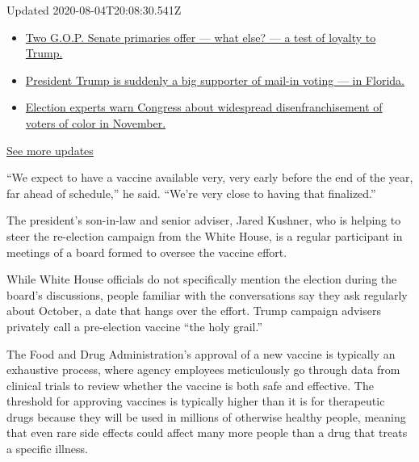 Updated 2020-08-04T20:08:30.541Z

\begin{itemize}
\tightlist
\item
  \href{https://www.nytimes3xbfgragh.onion/2020/08/04/us/elections/primary-election-michigan-arizona-kansas.html?action=click\&pgtype=Article\&state=default\&region=MAIN_CONTENT_1\&context=storylines_live_updates\#link-3924dd44}{Two
  G.O.P. Senate primaries offer --- what else? --- a test of loyalty to
  Trump.}
\item
  \href{https://www.nytimes3xbfgragh.onion/2020/08/04/us/elections/primary-election-michigan-arizona-kansas.html?action=click\&pgtype=Article\&state=default\&region=MAIN_CONTENT_1\&context=storylines_live_updates\#link-32b39e33}{President
  Trump is suddenly a big supporter of mail-in voting --- in Florida.}
\item
  \href{https://www.nytimes3xbfgragh.onion/2020/08/04/us/elections/primary-election-michigan-arizona-kansas.html?action=click\&pgtype=Article\&state=default\&region=MAIN_CONTENT_1\&context=storylines_live_updates\#link-6d019753}{Election
  experts warn Congress about widespread disenfranchisement of voters of
  color in November.}
\end{itemize}

\href{https://www.nytimes3xbfgragh.onion/2020/08/04/us/elections/primary-election-michigan-arizona-kansas.html?action=click\&pgtype=Article\&state=default\&region=MAIN_CONTENT_1\&context=storylines_live_updates}{See
more updates}

``We expect to have a vaccine available very, very early before the end
of the year, far ahead of schedule,'' he said. ``We're very close to
having that finalized.''

The president's son-in-law and senior adviser, Jared Kushner, who is
helping to steer the re-election campaign from the White House, is a
regular participant in meetings of a board formed to oversee the vaccine
effort.

While White House officials do not specifically mention the election
during the board's discussions, people familiar with the conversations
say they ask regularly about October, a date that hangs over the effort.
Trump campaign advisers privately call a pre-election vaccine ``the holy
grail.''

The Food and Drug Administration's approval of a new vaccine is
typically an exhaustive process, where agency employees meticulously go
through data from clinical trials to review whether the vaccine is both
safe and effective. The threshold for approving vaccines is typically
higher than it is for therapeutic drugs because they will be used in
millions of otherwise healthy people, meaning that even rare side
effects could affect many more people than a drug that treats a specific
illness.

